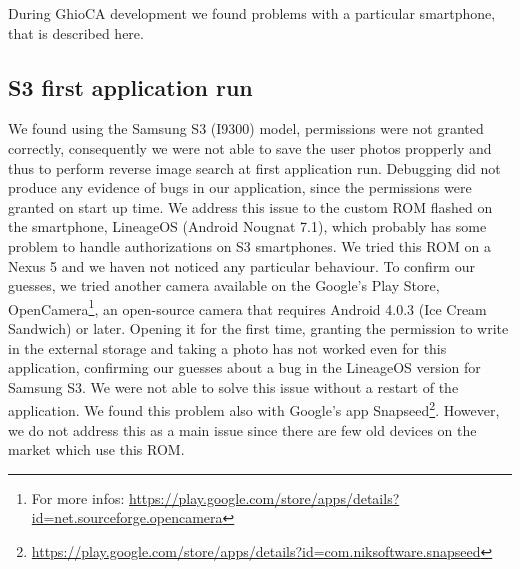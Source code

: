 During GhioCA development we found problems with a particular smartphone, that is described here.

\subsection{S3 first application run}

We found using the Samsung S3 (I9300) model, permissions were not granted correctly, consequently we were not able to save the user photos propperly and thus to perform reverse image search at first application run. Debugging did not produce any evidence of bugs in our application, since the permissions were granted on start up time.
We address this issue to the custom ROM flashed on the smartphone, LineageOS (Android Nougnat 7.1), which probably has some problem to handle authorizations on S3 smartphones. We tried this ROM on a Nexus 5 and we haven not noticed any particular behaviour.
To confirm our guesses, we tried another camera available on the Google's Play Store, OpenCamera\footnote{For more infos: \url{https://play.google.com/store/apps/details?id=net.sourceforge.opencamera}}, an open-source camera that requires Android 4.0.3 (Ice Cream Sandwich) or later.
Opening it for the first time, granting the permission to write in the external storage and taking a photo has not worked even for this application, confirming our guesses about a bug in the LineageOS version for Samsung S3.
We were not able to solve this issue without a restart of the application. We found this problem also with Google's app Snapseed\footnote{\url{https://play.google.com/store/apps/details?id=com.niksoftware.snapseed}}.
However, we do not address this as a main issue since there are few old devices on the market which use this ROM.
